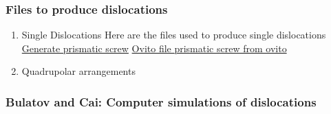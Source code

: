 \documentclass[11pt]{article}
\begin{document}
\subsubsection{Files to produce dislocations}
\label{sec-2-1-1}
\begin{enumerate}
\item Single Dislocations
\label{sec-2-1-1-1}
Here are the files used to produce single dislocations
\href{file:///home/tigany/Documents/disl_gsurf/useful_python/bop/dislocations/create_dislocations/gen_prismatic_screw_tbe.py}{Generate prismatic screw} \href{file:///home/tigany/Documents/disl_gsurf/useful_python/bop/dislocations/create_dislocations/test/generated_dislocations/site.ti_9x_9y_8z_square_1_dislanis_prim_rot_convert.xyz}{Ovito file }
\href{file:///home/tigany/Pictures/prismatic_screw_tbe_full_anis.png}{prismatic screw from ovito }
\item Quadrupolar arrangements
\label{sec-2-1-1-2}
\end{enumerate}

\subsubsection{Bulatov and Cai: Computer simulations of dislocations}
\label{sec-2-1-2}
\end{document}
